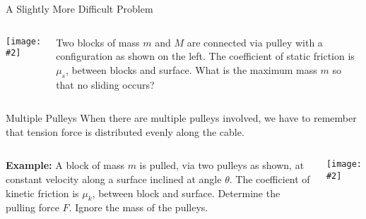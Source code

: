 \documentclass[12pt,compress,aspectratio=169]{beamer}
\newcommand{\pic}[2]{\texttt{[image: \#2]}}
\begin{document}
\begin{frame}{A Slightly More Difficult Problem}
  \begin{columns}
    \pic{1}{graphics/pulley_prob_5.png}
    
    Two blocks of mass $m$ and $M$ are connected via pulley with a
    configuration as shown on the left. The coefficient of static friction is
    $\mu_s$, between blocks and surface. What is the maximum mass $m$ so that
    no sliding occurs?
  \end{columns}
\end{frame}



%    



\begin{frame}{Multiple Pulleys}
  When there are multiple pulleys involved, we have to remember that tension
  force is distributed evenly along the cable.

  \vspace{.2in}
  \begin{columns}
    \textbf{Example:} A block of mass $m$ is pulled, via two pulleys as shown,
    at constant velocity along a surface inclined at angle $\theta$. The
    coefficient of kinetic friction is $\mu_k$, between block and surface.
    Determine the pulling force $F$. Ignore the mass of the pulleys. 
    
    \pic{1}{graphics/pulley_prob_7.png}
  \end{columns}  
\end{frame}
\end{document}
